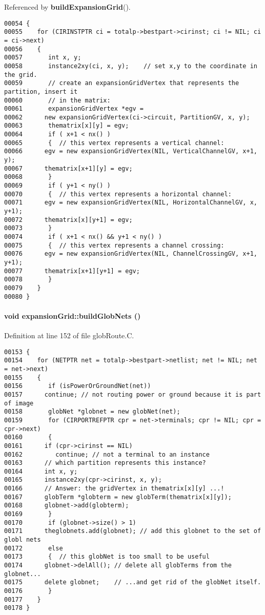 Referenced by {\bf build\-Expansion\-Grid}().\small\begin{verbatim}00054 {
00055    for (CIRINSTPTR ci = totalp->bestpart->cirinst; ci != NIL; ci = ci->next)
00056    {
00057       int x, y;
00058       instance2xy(ci, x, y);    // set x,y to the coordinate in the grid.
00059       // create an expansionGridVertex that represents the partition, insert it
00060       // in the matrix:
00061       expansionGridVertex *egv =
00062      new expansionGridVertex(ci->circuit, PartitionGV, x, y);
00063       thematrix[x][y] = egv;
00064       if ( x+1 < nx() )
00065       {  // this vertex represents a vertical channel:
00066      egv = new expansionGridVertex(NIL, VerticalChannelGV, x+1, y);
00067      thematrix[x+1][y] = egv;
00068       }
00069       if ( y+1 < ny() )
00070       {  // this vertex represents a horizontal channel:
00071      egv = new expansionGridVertex(NIL, HorizontalChannelGV, x, y+1);
00072      thematrix[x][y+1] = egv;
00073       }
00074       if ( x+1 < nx() && y+1 < ny() )
00075       {  // this vertex represents a channel crossing:
00076      egv = new expansionGridVertex(NIL, ChannelCrossingGV, x+1, y+1);
00077      thematrix[x+1][y+1] = egv;
00078       }
00079    }
00080 }
\end{verbatim}\normalsize 
\label{expansionGrid_c4}
\paragraph{\setlength{\rightskip}{0pt plus 5cm}void expansion\-Grid::build\-Glob\-Nets ()\hspace{0.3cm}{\tt  [private]}}\hfill



Definition at line 152 of file glob\-Route.C.\small\begin{verbatim}00153 {
00154    for (NETPTR net = totalp->bestpart->netlist; net != NIL; net = net->next)
00155    {
00156       if (isPowerOrGroundNet(net))
00157      continue; // not routing power or ground because it is part of image
00158       globNet *globnet = new globNet(net);
00159       for (CIRPORTREFPTR cpr = net->terminals; cpr != NIL; cpr = cpr->next)
00160       {
00161      if (cpr->cirinst == NIL)
00162         continue; // not a terminal to an instance
00163      // which partition represents this instance?
00164      int x, y;
00165      instance2xy(cpr->cirinst, x, y);
00166      // Answer: the gridVertex in thematrix[x][y] ...!
00167      globTerm *globterm = new globTerm(thematrix[x][y]);
00168      globnet->add(globterm);
00169       }
00170       if (globnet->size() > 1)
00171      theglobnets.add(globnet); // add this globnet to the set of globl nets
00172       else
00173       {  // this globNet is too small to be useful
00174      globnet->delAll(); // delete all globTerms from the globnet...
00175      delete globnet;    // ...and get rid of the globNet itself.
00176       }
00177    }
00178 }
\end{verbatim}\normalsize 
\label{expansionGrid_a8}
